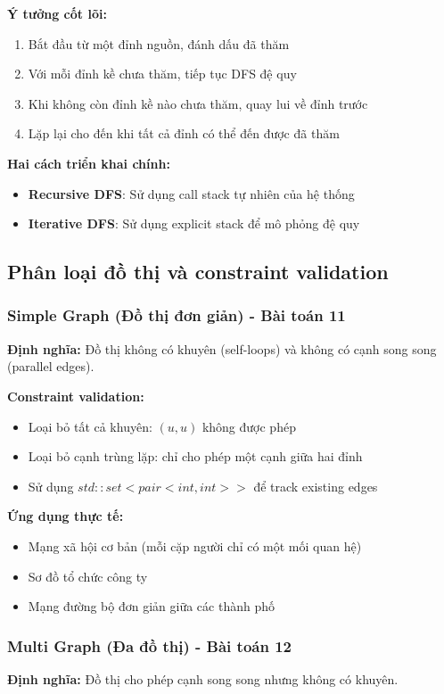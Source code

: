 \documentclass[12pt]{article}
\begin{document}
\textbf{Ý tưởng cốt lõi:}
\begin{enumerate}
    \item Bắt đầu từ một đỉnh nguồn, đánh dấu đã thăm
    \item Với mỗi đỉnh kề chưa thăm, tiếp tục DFS đệ quy
    \item Khi không còn đỉnh kề nào chưa thăm, quay lui về đỉnh trước
    \item Lặp lại cho đến khi tất cả đỉnh có thể đến được đã thăm
\end{enumerate}

\textbf{Hai cách triển khai chính:}
\begin{itemize}
    \item \textbf{Recursive DFS}: Sử dụng call stack tự nhiên của hệ thống
    \item \textbf{Iterative DFS}: Sử dụng explicit stack để mô phỏng đệ quy
\end{itemize}

\subsection*{Phân loại đồ thị và constraint validation}

\subsubsection*{Simple Graph (Đồ thị đơn giản) - Bài toán 11}
\textbf{Định nghĩa:} Đồ thị không có khuyên (self-loops) và không có cạnh song song (parallel edges).

\textbf{Constraint validation:}
\begin{itemize}
    \item Loại bỏ tất cả khuyên: $(u, u)$ không được phép
    \item Loại bỏ cạnh trùng lặp: chỉ cho phép một cạnh giữa hai đỉnh
    \item Sử dụng $std::set<pair<int, int>>$ để track existing edges
\end{itemize}

\textbf{Ứng dụng thực tế:}
\begin{itemize}
    \item Mạng xã hội cơ bản (mỗi cặp người chỉ có một mối quan hệ)
    \item Sơ đồ tổ chức công ty
    \item Mạng đường bộ đơn giản giữa các thành phố
\end{itemize}

\subsubsection*{Multi Graph (Đa đồ thị) - Bài toán 12}
\textbf{Định nghĩa:} Đồ thị cho phép cạnh song song nhưng không có khuyên.
\end{document}
